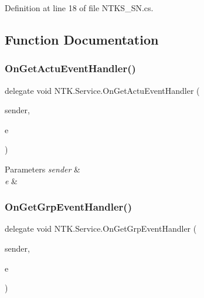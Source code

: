 Definition at line 18 of file N\+T\+K\+S\+\_\+\+S\+N.\+cs.



\subsection{Function Documentation}
\mbox{\label{namespace_n_t_k_1_1_service_aaea6a2e360a41254ddf2d5459fd2135f}} 
\subsubsection{\texorpdfstring{OnGetActuEventHandler()}{OnGetActuEventHandler()}}
{\footnotesize\ttfamily delegate void N\+T\+K.\+Service.\+On\+Get\+Actu\+Event\+Handler (\begin{DoxyParamCaption}\item[{object}]{sender,  }\item[{\mbox{\hyperlink{class_n_t_k_1_1_events_args_1_1_get_actu_event_args}{Get\+Actu\+Event\+Args}}}]{e }\end{DoxyParamCaption})}






\begin{DoxyParams}{Parameters}
{\em sender} & \\
\hline
{\em e} & \\
\hline
\end{DoxyParams}
\mbox{\label{namespace_n_t_k_1_1_service_ad014f00ab4e82ad6ce8808bb063f8b31}} 
\subsubsection{\texorpdfstring{OnGetGrpEventHandler()}{OnGetGrpEventHandler()}}
{\footnotesize\ttfamily delegate void N\+T\+K.\+Service.\+On\+Get\+Grp\+Event\+Handler (\begin{DoxyParamCaption}\item[{object}]{sender,  }\item[{\mbox{\hyperlink{class_n_t_k_1_1_events_args_1_1_get_grp_event_args}{Get\+Grp\+Event\+Args}}}]{e }\end{DoxyParamCaption})}






